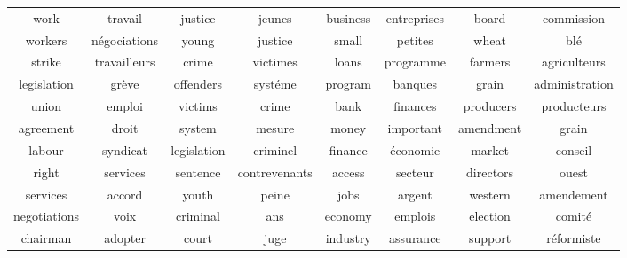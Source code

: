 \documentclass{article}
\begin{document}
\newpage
\cleardoublepage
\setlength{\textfloatsep}{9pt}
\begin{table*}[h!] 
\centering
\begin{tabular}{cc|cc|cc|cc} 
                 work &              travail &               justice &               jeunes &              business &          entreprises &                 board &           commission  \\ 
               workers &        n\'egociations &                 young &              justice &                 small &              petites &                 wheat &                 bl\'e  \\ 
                strike &         travailleurs &                 crime &             victimes &                 loans &            programme &               farmers &         agriculteurs  \\ 
           legislation &               gr\`eve &             offenders &             syst\'eme &               program &              banques &                 grain &       administration  \\ 
                 union &               emploi &               victims &                crime &                  bank &             finances &             producers &          producteurs  \\ 
             agreement &                droit &                system &               mesure &                 money &            important &             amendment &                grain  \\ 
                labour &             syndicat &           legislation &             criminel &               finance &            \'economie &                market &              conseil  \\ 
                 right &             services &              sentence &        contrevenants &                access &              secteur &             directors &                ouest  \\ 
              services &               accord &                 youth &                peine &                  jobs &               argent &               western &           amendement  \\ 
          negotiations &                 voix &              criminal &                  ans &               economy &              emplois &              election &              comit\'e  \\ 
              chairman &              adopter &                 court &                 juge &              industry &            assurance &               support &          r\'eformiste  \\ 

\end{tabular}
\end{table*}
\end{document}
